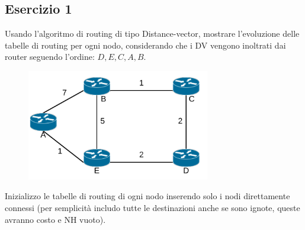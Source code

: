\documentclass[10pt]{article}
\begin{document}
		\subsection{Esercizio 1}
			Usando l'algoritmo di routing di tipo Distance-vector, mostrare l'evoluzione delle tabelle di routing per ogni nodo, considerando che i DV vengono inoltrati dai router seguendo l'ordine: ${D,E,C,A,B}$.
			\begin{figure}[h!]
				\centering
				\includegraphics[width=8cm]{esercizio1}
			\end{figure}
			Inizializzo le tabelle di routing di ogni nodo inserendo solo i nodi direttamente connessi (per semplicità includo tutte le destinazioni anche se sono ignote, queste avranno costo e NH vuoto).
\end{document}
